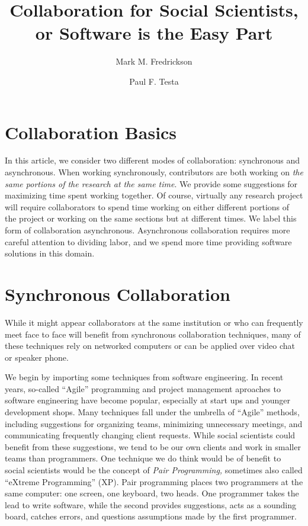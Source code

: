 \documentclass[]{article}
\author{Mark M. Fredrickson \and Paul F. Testa} %
\title{Collaboration for Social Scientists, or Software is the Easy Part}
\begin{document}
\maketitle
\section{Collaboration Basics}


In this article, we consider two different modes of collaboration: synchronous
and asynchronous. When working synchronously, contributors are both working on
\emph{the same portions of the research at the same time}. We provide some
suggestions for maximizing time spent working together. Of course, virtually
any research project will require collaborators to spend time working on
either different portions of the project or working on the same sections but
at different times. We label this form of collaboration asynchronous.
Asynchronous collaboration requires more careful attention to dividing labor,
and we spend more time providing software solutions in this domain.

\section{Synchronous Collaboration}

While it might appear collaborators at the same institution or who can
frequently meet face to face will benefit from synchronous collaboration
techniques, many of these techniques rely on networked computers or can be
applied over video chat or speaker phone.

We begin by importing some techniques from software engineering. In recent
years, so-called ``Agile'' programming and project management aproaches to
software engineering have become popular, especially at start ups and younger
development shops. Many techniques fall under the umbrella of ``Agile''
methods, including suggestions for organizing teams, minimizing unnecessary
meetings, and communicating frequently changing client requests. While social
scientists could benefit from these suggestions, we tend to be our own clients
and work in smaller teams than programmers. One technique we do think would be
of benefit to social scientists would be the concept of \emph{Pair
Programming,} sometimes also called ``eXtreme Programming'' (XP). Pair
programming places two programmers at the same computer: one screen, one
keyboard, two heads. One programmer takes the lead to write software, while
the second provides suggestions, acts as a sounding board, catches errors, and
questions assumptions made by the first programmer. 
\end{document}
